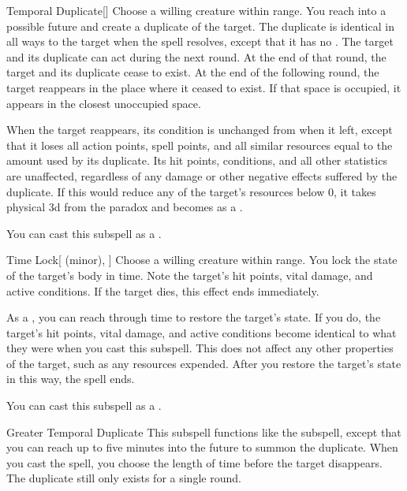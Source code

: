 \begin{ability}[\nth{4}]{Temporal Duplicate}[]
Choose a willing creature within \rngmed range.
You reach into a possible future and create a duplicate of the target.
The duplicate is identical in all ways to the target when the spell resolves, except that it has no .
The target and its duplicate can act during the next round.
At the end of that round, the target and its duplicate cease to exist.
At the end of the following round, the target reappears in the place where it ceased to exist.
If that space is occupied, it appears in the closest unoccupied space.

When the target reappears, its condition is unchanged from when it left, except that it loses all action points, spell points, and all similar resources equal to the amount used by its duplicate.
Its hit points, conditions, and all other statistics are unaffected, regardless of any damage or other negative effects suffered by the duplicate.
If this would reduce any of the target's resources below 0, it takes physical  \plus3d from the paradox and becomes  as a .

You can cast this subspell as a .
\end{ability}
\vspace{0.25em}


\begin{ability}[\nth{4}]{Time Lock}[ (minor), ]
Choose a willing creature within \rngmed range.
You lock the state of the target's body in time.
Note the target's hit points, vital damage, and active conditions.
If the target dies, this effect ends immediately.

As a , you can reach through time to restore the target's state.
If you do, the target's hit points, vital damage, and active conditions become identical to what they were when you cast this subspell.
This does not affect any other properties of the target, such as any resources expended.
After you restore the target's state in this way, the spell ends.

You can cast this subspell as a .
\end{ability}
\vspace{0.25em}


\begin{ability}[\nth{7}]{Greater Temporal Duplicate}
This subspell functions like the  subspell, except that you can reach up to five minutes into the future to summon the duplicate.
When you cast the spell, you choose the length of time before the target disappears.
The duplicate still only exists for a single round.
\end{ability}
\vspace{0.25em}


